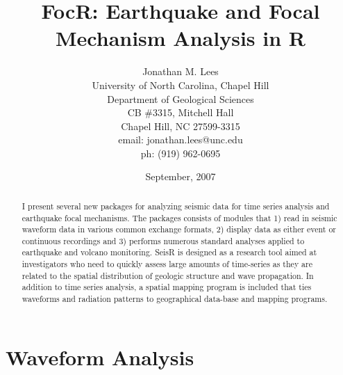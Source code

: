 \documentclass{article}
\begin{document}








\author{Jonathan M. Lees\\
University of North Carolina, Chapel Hill\\
Department of Geological Sciences\\
CB \#3315, Mitchell Hall\\
Chapel Hill, NC  27599-3315\\
email: jonathan.lees@unc.edu\\
ph: (919) 962-0695
}
\title{FocR: Earthquake and Focal Mechanism Analysis in R}
\date{September, 2007}

\maketitle


\begin{abstract}
I present several new packages for analyzing seismic data for time
series analysis and earthquake focal mechanisms.  The packages
consists of modules that 1) read in seismic waveform data in various
common exchange formats, 2) display data as either event or continuous
recordings and 3) performs numerous standard analyses applied to
earthquake and volcano monitoring.  SeisR is designed as a research
tool aimed at investigators who need to quickly assess large amounts
of time-series as they are related to the spatial distribution of
geologic structure and wave propagation.  In addition to time series
analysis, a spatial mapping program is included that ties waveforms
and radiation patterns to geographical data-base and mapping programs.
\end{abstract}


\section{Waveform Analysis}
\end{document}
